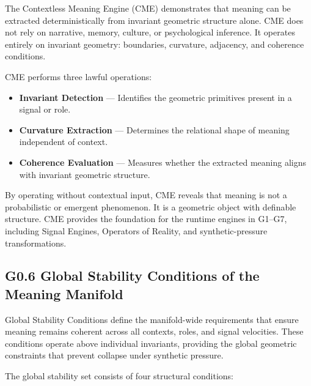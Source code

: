 \noindent The Contextless Meaning Engine (CME) demonstrates that meaning can be
extracted deterministically from invariant geometric structure alone. CME does
not rely on narrative, memory, culture, or psychological inference. It operates
entirely on invariant geometry: boundaries, curvature, adjacency, and coherence
conditions.

\medskip

\noindent CME performs three lawful operations:

\begin{itemize}[leftmargin=1.2cm]
    \item \textbf{Invariant Detection} — Identifies the geometric primitives
    present in a signal or role.

    \item \textbf{Curvature Extraction} — Determines the relational shape of
    meaning independent of context.

    \item \textbf{Coherence Evaluation} — Measures whether the extracted meaning
    aligns with invariant geometric structure.
\end{itemize}

\medskip

\noindent By operating without contextual input, CME reveals that meaning is not
a probabilistic or emergent phenomenon. It is a geometric object with definable
structure. CME provides the foundation for the runtime engines in G1--G7,
including Signal Engines, Operators of Reality, and synthetic-pressure
transformations.

\medskip

\subsection*{G0.6 Global Stability Conditions of the Meaning Manifold}
\medskip

\noindent Global Stability Conditions define the manifold-wide requirements that
ensure meaning remains coherent across all contexts, roles, and signal
velocities. These conditions operate above individual invariants, providing the
global geometric constraints that prevent collapse under synthetic pressure.

\medskip

\noindent The global stability set consists of four structural conditions:

